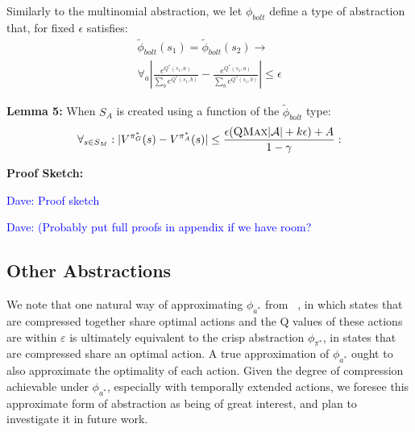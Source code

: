 \documentclass{article}
\newcommand{\ep}{\widetilde \phi}
\newcommand\dnote[1]{\textcolor{blue}{Dave: #1}}
\begin{document}
Similarly to the multinomial abstraction, we let $\phi_{bolt}$ define a type of abstraction that, for fixed $\epsilon$ satisfies:
\begin{multline}
\ep_{bolt}(s_1) = \ep_{bolt}(s_2) \rightarrow \\
\forall_{a} \left|\frac{e^{Q^*(s_1,a)}}{\sum_b e^{Q^*(s_1,b)}} - \frac{e^{Q^*(s_1,a)}}{\sum_b e^{Q^*(s_1,b)}}\right| \leq \epsilon
\end{multline}

{\bf Lemma 5:} When $S_A$ is created using a function of the $\ep_{bolt}$ type:
\begin{equation}
\forall_{s \in S_M} : | V^{\pi^*_G}(s) - V^{\pi^*_{A}}(s) | \leq \frac{\epsilon(\textsc{QMax}|\mathcal{A}| + k\epsilon) + A}{1-\gamma}:
\end{equation}

{\bf Proof Sketch:}

\dnote{Proof sketch}


\dnote{(Probably put full proofs in appendix if we have room?}











\subsection{Other Abstractions}

We note that one natural way of approximating $\phi_{a^*}$ from ~\cite{li2006towards}, in which states that are compressed together share optimal actions and the Q values of these actions are within $\varepsilon$ is ultimately equivalent to the crisp abstraction $\phi_{\pi^*}$, in states that are compressed share an optimal action. A true approximation of $\phi_{a^*}$ ought to also approximate the optimality of each action. Given the degree of compression achievable under $\phi_{a^*}$, especially with temporally extended actions, we foresee this approximate form of abstraction as being of great interest, and plan to investigate it in future work.
\end{document}
